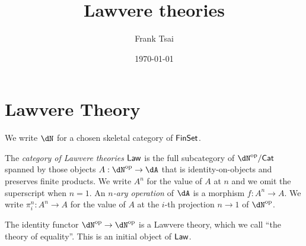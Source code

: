 \documentclass{zett}
\title{Lawvere theories}
\author{Frank Tsai}
\date{\today}
\begin{document}
\maketitle
\tableofcontents

\section{Lawvere Theory}
\label{sec:lawvere-theory}

\begin{node}
  We write $\dN$ for a chosen skeletal category of $\mathsf{FinSet}$.
\end{node}

\begin{defn}
  The \emph{category of Lawvere theories} $\mathsf{Law}$ is the full subcategory of $\dN\op/\CCat$ spanned by those objects $A : \dN\op \to \dA$ that is identity-on-objects and preserves finite products.
  We write $A^{n}$ for the value of $A$ at $n$ and we omit the superscript when $n = 1$.
  An \emph{$n$-ary operation} of $\dA$ is a morphism $f : A^{n} \to A$.
  We write $\pi^{n}_{i} : A^{n} \to A$ for the value of $A$ at the $i$-th projection $n \to 1$ of $\dN\op$.
\end{defn}

\begin{eg}
  The identity functor $\dN\op \to \dN\op$ is a Lawvere theory, which we call ``the theory of equality''.
  This is an initial object of $\mathsf{Law}$.
\end{eg}
\end{document}
